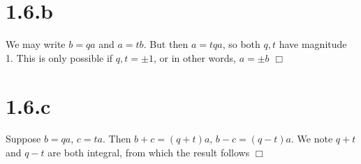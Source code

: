 \documentclass{article}
\begin{document}
\section*{1.6.b}
We may write $b = qa$ and $a = tb$. But then $a = tqa$, so both $q,t$ have magnitude 1. This is only possible if $q,t = \pm 1$, or in other words, $a = \pm b$ $\Box$
\section*{1.6.c}
Suppose $b = qa$, $c = ta$. Then $b+c = (q+t)a$, $b-c = (q-t)a$. We note $q+t$ and $q-t$ are both integral, from which the result follows $\Box$
\end{document}
